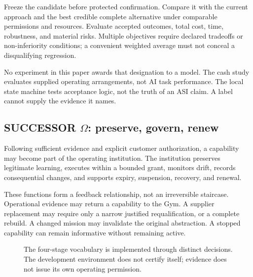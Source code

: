 Freeze the candidate before protected confirmation. Compare it with the current approach and the best credible complete alternative under comparable permissions and resources. Evaluate accepted outcomes, total cost, time, robustness, and material risks. Multiple objectives require declared tradeoffs or non-inferiority conditions; a convenient weighted average must not conceal a disqualifying regression.

No experiment in this paper awards that designation to a model. The cash study evaluates supplied operating arrangements, not AI task performance. The local state machine tests acceptance logic, not the truth of an ASI claim. A label cannot supply the evidence it names.

\subsection{SUCCESSOR \texorpdfstring{$\Omega$}{Omega}: preserve, govern, renew}
Following sufficient evidence and explicit customer authorization, a capability may become part of the operating institution. The institution preserves legitimate learning, executes within a bounded grant, monitors drift, records consequential changes, and supports expiry, suspension, recovery, and renewal.

These functions form a feedback relationship, not an irreversible staircase. Operational evidence may return a capability to the Gym. A supplier replacement may require only a narrow justified requalification, or a complete rebuild. A changed mission may invalidate the original abstraction. A stopped capability can remain informative without remaining active.

\begin{figure}[htbp]
\centering
{}
\caption{The four-stage vocabulary is implemented through distinct decisions. The development environment does not certify itself; evidence does not issue its own operating permission.}
\end{figure}
